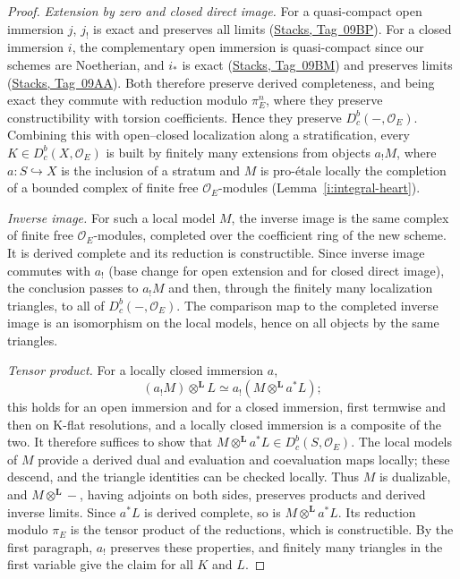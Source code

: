 \documentclass[11pt,a4paper]{article}
\numberwithin{equation}{section}
\theoremstyle{definition}
\theoremstyle{remark}
\newcommand{\Dbc}{D^b_c}
\newcommand{\stacks}[1]{\href{https://stacks.math.columbia.edu/tag/#1}{\textnormal{Stacks, Tag~#1}}}
\begin{document}
\begin{proof}
\emph{Extension by zero and closed direct image.} For a quasi-compact
open immersion $j$, $j_!$ is exact and preserves all limits
(\stacks{09BP}). For a closed immersion $i$, the complementary open
immersion is quasi-compact since our schemes are Noetherian, and $i_*$
is exact (\stacks{09BM}) and preserves limits (\stacks{09AA}). Both
therefore preserve derived completeness, and being exact they commute
with reduction modulo $\pi_E^n$, where they preserve constructibility
with torsion coefficients. Hence they preserve $\Dbc(-,\mathcal O_E)$. Combining
this with open--closed localization along a stratification, every
$K\in\Dbc(X,\mathcal O_E)$ is built by finitely many extensions from
objects $a_!M$, where $a:S\hookrightarrow X$ is the inclusion of a
stratum and $M$ is pro-\'etale locally the completion of a bounded
complex of finite free $\mathcal O_E$-modules (Lemma~\ref{i:integral-heart}).

\emph{Inverse image.} For such a local model $M$, the inverse image is
the same complex of finite free $\mathcal O_E$-modules, completed over the
coefficient ring of the new scheme. It is derived complete and its
reduction is constructible. Since inverse image commutes with $a_!$ (base
change for open extension and for closed direct image), the conclusion
passes to $a_!M$ and then, through the finitely many localization
triangles, to all of $\Dbc(-,\mathcal O_E)$. The comparison map to the
completed inverse image is an isomorphism on the local models, hence on
all objects by the same triangles.

\emph{Tensor product.} For a locally closed immersion $a$,
\[
 (a_!M)\otimes^{\mathbf L} L\simeq a_!(M\otimes^{\mathbf L} a^*L);
\]
this holds for an open immersion and for a closed immersion, first
termwise and then on K-flat resolutions, and a locally closed immersion
is a composite of the two. It therefore suffices to show that
$M\otimes^{\mathbf L}a^*L\in\Dbc(S,\mathcal O_E)$. The local models of
$M$ provide a derived dual and evaluation and coevaluation maps locally;
these descend, and the triangle identities can be checked locally. Thus
$M$ is dualizable, and $M\otimes^{\mathbf L}-$, having adjoints on both
sides, preserves products and derived inverse limits. Since $a^*L$ is
derived complete, so is $M\otimes^{\mathbf L}a^*L$. Its reduction modulo
$\pi_E$ is the tensor product of the reductions, which is constructible.
By the first paragraph, $a_!$ preserves these properties, and finitely
many triangles in the first variable give the claim for all $K$ and $L$.
\end{proof}
\end{document}
